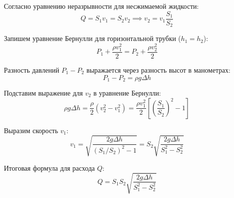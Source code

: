 Согласно уравнению неразрывности для несжимаемой жидкости:
\[ Q = S_1 v_1 = S_2 v_2 \implies v_2 = v_1 \frac{S_1}{S_2} \]

Запишем уравнение Бернулли для горизонтальной трубки ($h_1 = h_2$):
\[ P_1 + \frac{\rho v_1^2}{2} = P_2 + \frac{\rho v_2^2}{2} \]

Разность давлений $P_1 - P_2$ выражается через разность высот в манометрах:
\[ P_1 - P_2 = \rho g \Delta h \]

Подставим выражение для $v_2$ в уравнение Бернулли:
\[ \rho g \Delta h = \frac{\rho}{2} (v_2^2 - v_1^2) = \frac{\rho v_1^2}{2} \left[ \left( \frac{S_1}{S_2} \right)^2 - 1 \right] \]

Выразим скорость $v_1$:
\[ v_1 = \sqrt{\frac{2g \Delta h}{(S_1/S_2)^2 - 1}} = S_2 \sqrt{\frac{2g \Delta h}{S_1^2 - S_2^2}} \]

Итоговая формула для расхода $Q$:
\[ \boxed{Q = S_1 S_2 \sqrt{\frac{2g \Delta h}{S_1^2 - S_2^2}}} \]